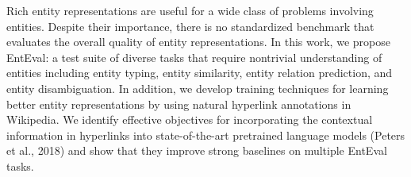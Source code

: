 Rich entity representations are useful for a wide class of problems involving entities. Despite  their importance, there is no standardized benchmark that evaluates the overall quality of entity representations. In this work, we propose EntEval: a test suite of diverse tasks that require nontrivial understanding of entities including entity typing, entity similarity, entity relation prediction, and entity disambiguation. In addition, we develop training techniques for learning better entity representations by using natural hyperlink annotations in Wikipedia. We identify effective objectives for incorporating the contextual information in hyperlinks into state-of-the-art pretrained language models (Peters et al., 2018) and show that they improve strong baselines on multiple EntEval tasks.